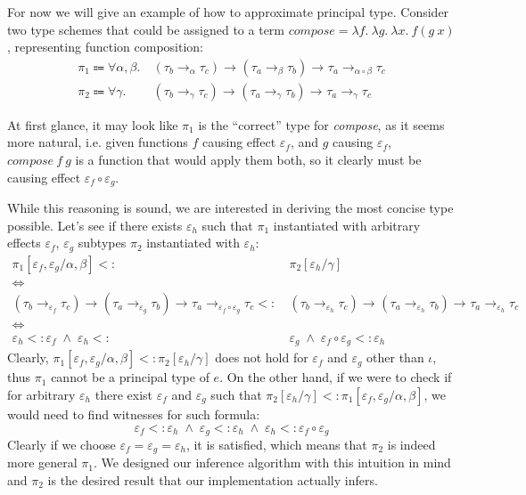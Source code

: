 \documentclass[declaration,shortabstract]{iithesis}
\theoremstyle{definition} \newtheorem{definition}{Definition}[section]
\newcommand{\arrow}[3]{{#1}\rightarrow_{#2}{#3}}
\newcommand{\lam}[1][x]{\ensuremath{\lambda #1.\:}}
\begin{document}
For now we will give an example of how to approximate principal type.
Consider two type schemes that could be assigned to a term $\textit{compose} = \lam[f]\lam[g]\lam f (g\:x) $, representing function composition:
\begin{align*}
    \pi_1\Coloneqq  \forall\alpha,\beta. &\:
    \arrow{(\arrow{\tau_b}{\alpha}{\tau_c})}{}{
        \arrow{(\arrow{\tau_a}{\beta}{\tau_b})}{}{
                \arrow{\tau_a}{\alpha \circ \beta}{\tau_c}}} 
    \\
    \pi_2\Coloneqq  \forall\gamma      . &\:
    \arrow{(\arrow{\tau_b}{\gamma}{\tau_c})}{}{
        \arrow{(\arrow{\tau_a}{\gamma}{\tau_b})}{}{
                \arrow{\tau_a}{\gamma}{\tau_c}}} 
\end{align*}

At first glance, it may look like $\pi_1$ is the ``correct'' type for \textit{compose}, as it seems more natural,
 i.e. given functions $f$ causing effect $\varepsilon_f$, and $g$ causing $\varepsilon_f$, $\textit{compose}\:f\:g$
is a function that would apply them both, so it clearly must be causing effect $\varepsilon_f \circ \varepsilon_g$.

While this reasoning is sound, we are interested in deriving the most concise type possible. Let's see if there exists $\varepsilon_h$ such that $\pi_1$ instantiated with arbitrary effects $\varepsilon_f$, $\varepsilon_g$ subtypes $\pi_2$ instantiated with $\varepsilon_h$:
\begin{align*}
    \pi_1[\varepsilon_f, \varepsilon_g / \alpha, \beta] <: & \: \pi_2 [\varepsilon_h / \gamma]
    \\ \iff \\ 
    \arrow{(\arrow{\tau_b}{\varepsilon_f}{\tau_c})}{}{
        \arrow{(\arrow{\tau_a}{\varepsilon_g}{\tau_b})}{}{
                \arrow{\tau_a}{\varepsilon_f \circ \varepsilon_g}{\tau_c}}} <: & \:
    \arrow{(\arrow{\tau_b}{\varepsilon_h}{\tau_c})}{}{
        \arrow{(\arrow{\tau_a}{\varepsilon_h}{\tau_b})}{}{
                \arrow{\tau_a}{\varepsilon_h}{\tau_c}}}
    \\ \iff \\ 
    \varepsilon_h <: \varepsilon_f          \;\wedge\; 
    \varepsilon_h <: &  \: \varepsilon_g    \;\wedge\; 
    \varepsilon_f \circ \varepsilon_g <: \varepsilon_h
\end{align*}
Clearly, $\pi_1[\varepsilon_f, \varepsilon_g / \alpha, \beta] <: \pi_2 [\varepsilon_h / \gamma]$
does not hold for $\varepsilon_f$ and $\varepsilon_g$ other than $\iota$, thus $\pi_1$ cannot be a principal type of $e$.
On the other hand, if we were to check if for arbitrary $\varepsilon_h$ there exist $\varepsilon_f$ and $\varepsilon_g$ such that
$\pi_2 [\varepsilon_h / \gamma] <: \pi_1[\varepsilon_f, \varepsilon_g / \alpha, \beta]$, we would need to find witnesses for such formula:
$$ \varepsilon_f <: \varepsilon_h          \;\wedge\; 
    \varepsilon_g <: \varepsilon_h    \;\wedge\; 
     \varepsilon_h <: \varepsilon_f \circ \varepsilon_g $$
Clearly if we choose $ \varepsilon_f = \varepsilon_g = \varepsilon_h$, it is satisfied, which means that $\pi_2$ is indeed more general $\pi_1$.
We designed our inference algorithm with this intuition in mind and $\pi_2$ is the desired result that our implementation actually infers.
\end{document}
